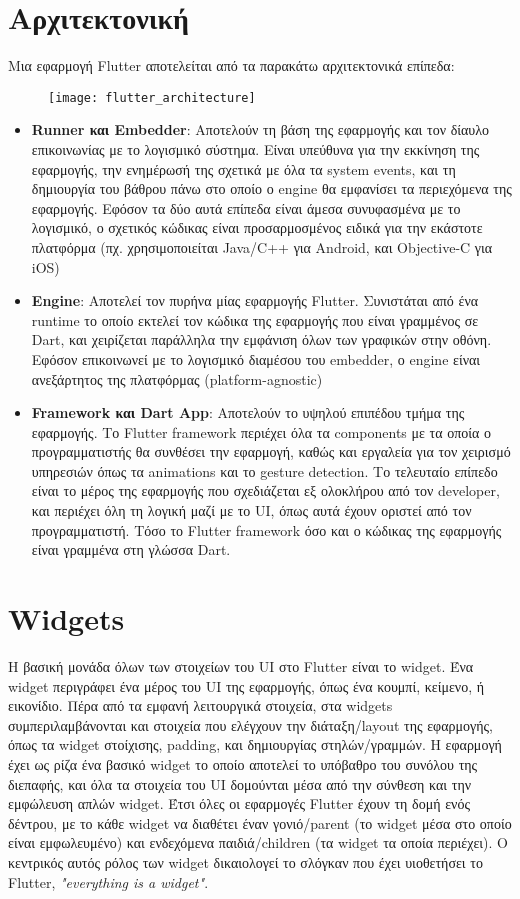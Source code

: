 \documentclass[../thesis.tex]{subfiles}
\begin{document}
\section{Αρχιτεκτονική}
Μια εφαρμογή Flutter αποτελείται από τα παρακάτω αρχιτεκτονικά επίπεδα:
\begin{figure}
    \centering
    \texttt{[image: flutter\_architecture]}
\end{figure}
\begin{itemize}
    \item \textbf{Runner και Embedder}: Αποτελούν τη βάση της εφαρμογής και τον δίαυλο επικοινωνίας με το λογισμικό σύστημα. Είναι υπεύθυνα για την εκκίνηση της εφαρμογής, την ενημέρωσή της σχετικά με όλα τα system events, και τη δημιουργία του βάθρου πάνω στο οποίο ο engine θα εμφανίσει τα περιεχόμενα της εφαρμογής. Εφόσον τα δύο αυτά επίπεδα είναι άμεσα συνυφασμένα με το λογισμικό, ο σχετικός κώδικας είναι προσαρμοσμένος ειδικά για την εκάστοτε πλατφόρμα (πχ. χρησιμοποιείται Java/C++ για Android, και Objective-C για iOS)
    \item \textbf{Engine}: Αποτελεί τον πυρήνα μίας εφαρμογής Flutter. Συνιστάται από ένα runtime το οποίο εκτελεί τον κώδικα της εφαρμογής που είναι γραμμένος σε Dart, και χειρίζεται παράλληλα την εμφάνιση όλων των γραφικών στην οθόνη. Εφόσον επικοινωνεί με το λογισμικό διαμέσου του embedder, ο engine είναι ανεξάρτητος της πλατφόρμας (platform-agnostic)
    \item \textbf{Framework και Dart App}: Αποτελούν το υψηλού επιπέδου τμήμα της εφαρμογής. Το Flutter framework περιέχει όλα τα components με τα οποία ο προγραμματιστής θα συνθέσει την εφαρμογή, καθώς και εργαλεία για τον χειρισμό υπηρεσιών όπως τα animations και το gesture detection. Το τελευταίο επίπεδο είναι το μέρος της εφαρμογής που σχεδιάζεται εξ ολοκλήρου από τον developer, και περιέχει όλη τη λογική μαζί με το UI, όπως αυτά έχουν οριστεί από τον προγραμματιστή. Τόσο το Flutter framework όσο και ο κώδικας της εφαρμογής είναι γραμμένα στη γλώσσα Dart.
\end{itemize}

\section{Widgets}
Η βασική μονάδα όλων των στοιχείων του UI στο Flutter είναι το widget.
Ένα widget περιγράφει ένα μέρος του UI της εφαρμογής, όπως ένα κουμπί, κείμενο, ή εικονίδιο.
Πέρα από τα εμφανή λειτουργικά στοιχεία, στα widgets συμπεριλαμβάνονται και στοιχεία που ελέγχουν την διάταξη/layout της εφαρμογής, όπως τα widget στοίχισης, padding, και δημιουργίας στηλών/γραμμών.
Η εφαρμογή έχει ως ρίζα ένα βασικό widget το οποίο αποτελεί το υπόβαθρο του συνόλου της διεπαφής, και όλα τα στοιχεία του UI δομούνται μέσα από την σύνθεση και την εμφώλευση απλών widget.
Έτσι όλες οι εφαρμογές Flutter έχουν τη δομή ενός δέντρου, με το κάθε widget να διαθέτει έναν γονιό/parent (το widget μέσα στο οποίο είναι εμφωλευμένο) και ενδεχόμενα παιδιά/children (τα widget τα οποία περιέχει).
Ο κεντρικός αυτός ρόλος των widget δικαιολογεί το σλόγκαν που έχει υιοθετήσει το Flutter, \textit{"everything is a widget"}.
\end{document}
